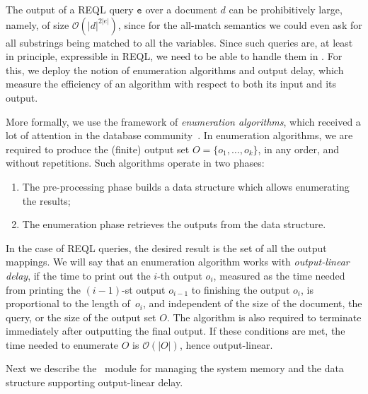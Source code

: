
The output of a REQL query $\texttt{e}$ over a document $d$ can be prohibitively large, namely, of size $\mathcal{O}(|d|^{2|e|})$, since for the all-match semantics we could even ask for all substrings being matched to all the variables. Since such queries are, at least in principle, expressible in REQL, we need to be able to handle them in \rematch. For this, we deploy the notion of enumeration algorithms and output delay, which measure the efficiency of an algorithm  %
with respect to both its input and its output.

More formally, we use the framework of \emph{enumeration algorithms}, which received a lot of attention in the database community~\cite{AmarilliBMN-tods21,FlorenzanoRUVV20,LosemannM-lics14,SchweikardtSV-jacm22,BerkholzGS-siglog20,Segoufin13,IdrisUVVL-vldbj20,IdrisUV-sigmod17,TziavelisAGRY-pvldb20}. In enumeration algorithms, we are required to produce the (finite) output set $O = \{o_1,\ldots ,o_k\}$, in any order, and without repetitions. Such algorithms operate in two phases:
\begin{enumerate}
	\item The pre-processing phase builds a data structure which allows enumerating the results;
	\item The enumeration phase retrieves the outputs from the data structure.%
\end{enumerate}
In the case of REQL queries, the desired result is the set of all the output mappings. We will say that an enumeration algorithm works with \emph{output-linear delay}, if the time to print out the $i$-th output $o_i$, measured as the time needed from printing the $(i-1)$-st output $o_{i-1}$ to finishing the output $o_i$, is proportional to the length of~$o_i$, and independent of the size of the document, the query, or the size of the output set $O$. The algorithm is also required to terminate immediately after outputting the final output. If these conditions are met, the time needed to enumerate $O$ is $\mathcal{O}(|O|)$, hence output-linear. 

Next we describe the \rematch\ module for managing the system memory and the data structure supporting output-linear delay.

